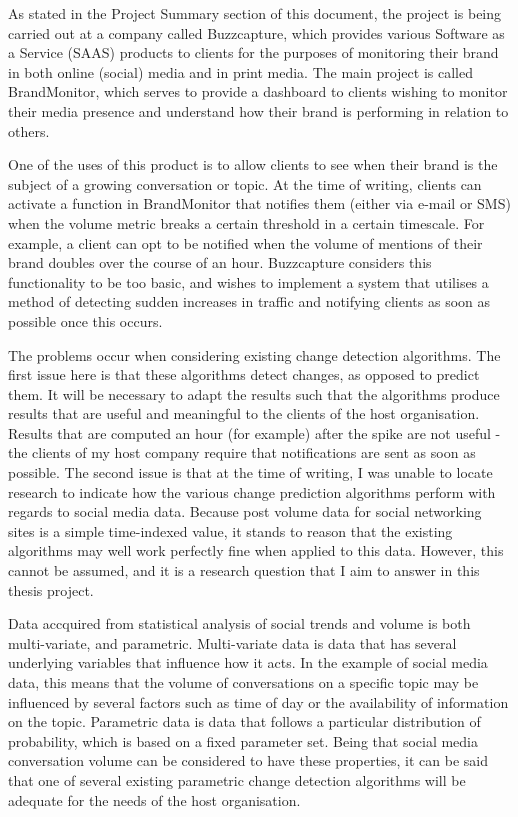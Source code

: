 \documentclass{uvamscse}
\begin{document}
As stated in the Project Summary section of this document, the project is being carried out at a company called Buzzcapture, which provides various Software as a Service (SAAS) products to clients for the purposes of monitoring their brand in both online (social) media and in print media. The main project is called BrandMonitor, which serves to provide a dashboard to clients wishing to monitor their media presence and understand how their brand is performing in relation to others.

One of the uses of this product is to allow clients to see when their brand is the subject of a growing conversation or topic. At the time of writing, clients can activate a function in BrandMonitor that notifies them (either via e-mail or SMS) when the volume metric breaks a certain threshold in a certain timescale. For example, a client can opt to be notified when the volume of mentions of their brand doubles over the course of an hour. Buzzcapture considers this functionality to be too basic, and wishes to implement a system that utilises a method of detecting sudden increases in traffic and notifying clients as soon as possible once this occurs.

The problems occur when considering existing change detection algorithms. The first issue here is that these algorithms detect changes, as opposed to predict them. It will be necessary to adapt the results such that the algorithms produce results that are useful and meaningful to the clients of the host organisation. Results that are computed an hour (for example) after the spike are not useful - the clients of my host company require that notifications are sent as soon as possible. The second issue is that at the time of writing, I was unable to locate research to indicate how the various change prediction algorithms perform with regards to social media data. Because post volume data for social networking sites is a simple time-indexed value, it stands to reason that the existing algorithms may well work perfectly fine when applied to this data. However, this cannot be assumed, and it is a research question that I aim to answer in this thesis project.

Data accquired from statistical analysis of social trends and volume is both multi-variate, and parametric. Multi-variate data is data that has several underlying variables that influence how it acts. In the example of social media data, this means that the volume of conversations on a specific topic may be influenced by several factors such as time of day or the availability of information on the topic. Parametric data is data that follows a particular distribution of probability, which is based on a fixed parameter set. Being that social media conversation volume can be considered to have these properties, it can be said that one of several existing parametric change detection algorithms will be adequate for the needs of the host organisation.
\end{document}
